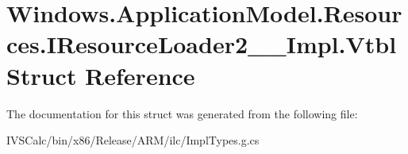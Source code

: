 \hypertarget{struct_windows_1_1_application_model_1_1_resources_1_1_i_resource_loader2_____impl_1_1_vtbl}{}\section{Windows.\+Application\+Model.\+Resources.\+I\+Resource\+Loader2\+\_\+\+\_\+\+Impl.\+Vtbl Struct Reference}
\label{struct_windows_1_1_application_model_1_1_resources_1_1_i_resource_loader2_____impl_1_1_vtbl}


The documentation for this struct was generated from the following file\+:\begin{DoxyCompactItemize}
\item 
I\+V\+S\+Calc/bin/x86/\+Release/\+A\+R\+M/ilc/Impl\+Types.\+g.\+cs\end{DoxyCompactItemize}
